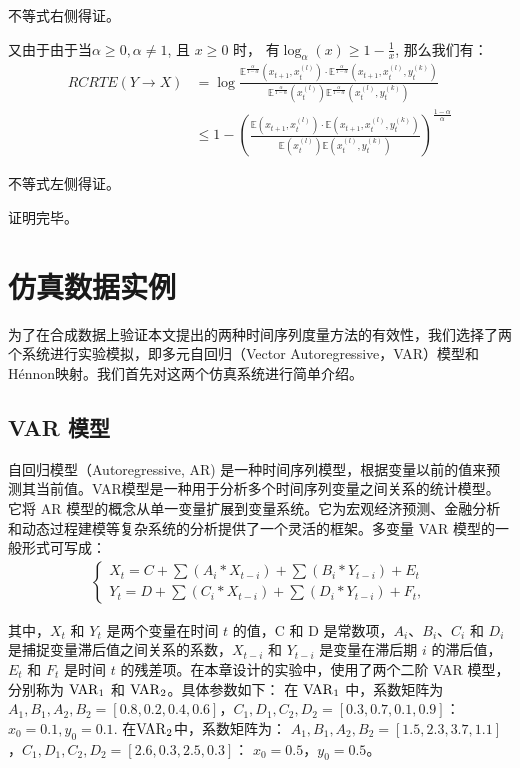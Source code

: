 不等式右侧得证。

又由于由于当$\alpha \ge 0, \alpha \neq 1$, 且 $x\ge0$ 时， 有$\log_{\alpha}(x)\geq 1-\frac{1}{x}$, 那么我们有：
\begin{align*}
RCRTE(Y \rightarrow X)&= \log \frac{\mathbb{E}^{\frac{\alpha}{1-\alpha}}(x_{t+1},x_{t}^{(l)})\cdot \mathbb{E}^{\frac{\alpha}{1-\alpha}}(x_{t+1},x_{t}^{(l)},y_{t}^{(k)})}{\mathbb{E}^{\frac{\alpha}{1-\alpha}}(x_{t}^{(l)})\mathbb{E}^{\frac{\alpha}{1-\alpha}}(x_{t}^{(l)},y_{t}^{(k)})}\\
& \leq 1- (\frac{\mathbb{E}(x_{t+1},x_{t}^{(l)})\cdot \mathbb{E}(x_{t+1},x_{t}^{(l)},y_{t}^{(k)})}{\mathbb{E}(x_{t}^{(l)})\mathbb{E}(x_{t}^{(l)},y_{t}^{(k)})})^{\frac{1-\alpha}{\alpha}}
\end{align*}

不等式左侧得证。

证明完毕。\\

\section{仿真数据实例}
为了在合成数据上验证本文提出的两种时间序列度量方法的有效性，我们选择了两个系统进行实验模拟，即多元自回归（Vector Autoregressive，VAR）模型和H\'{e}nnon映射。我们首先对这两个仿真系统进行简单介绍。

\subsection{VAR 模型}
自回归模型（Autoregressive, AR) 是一种时间序列模型，根据变量以前的值来预测其当前值。VAR模型是一种用于分析多个时间序列变量之间关系的统计模型。它将 AR 模型的概念从单一变量扩展到变量系统。它为宏观经济预测、金融分析和动态过程建模等复杂系统的分析提供了一个灵活的框架。多变量 VAR 模型的一般形式可写成：
\begin{align*}
\begin{cases}
X_{t} = C + \sum (A_{i} * X_{t-i}) + \sum(B_{i} * Y_{t-i}) + E_{t}\\
Y_{t} = D + \sum(C_{i} * X_{t-i}) + \sum(D_{i} * Y_{t-i}) + F_{t},
\end{cases}
\end{align*}

其中，$X_t$ 和 $Y_t$ 是两个变量在时间 $t$ 的值，C 和 D 是常数项，$A_i$、$B_i$、$C_i$ 和 $D_i$ 是捕捉变量滞后值之间关系的系数，$X_{t-i}$ 和 $Y_{t-i}$ 是变量在滞后期 $i$ 的滞后值，$E_t$ 和 $F_t$ 是时间 $t$ 的残差项。在本章设计的实验中，使用了两个二阶 VAR 模型，分别称为 $\rm{VAR}_1$ 和 $\rm{VAR}_2$。具体参数如下： 在 $\rm{VAR}_1$ 中，系数矩阵为 $A_1,B_1,A_2,B_{2}=[0.8,0.2,0.4,0.6]$，$C_1,D_1,C_2,D_{2}=[0.3,0.7,0.1,0.9]$： $x_{0} = 0.1, y_{0} = 0.1.$ 在$\rm{VAR}_2$中，系数矩阵为： $A_1,B_1,A_2,B_{2}=[1.5,2.3,3.7,1.1]$，$C_1,D_1,C_2,D_{2}=[2.6,0.3,2.5,0.3]$： $x_{0}=0.5，y_{0}=0.5$。

